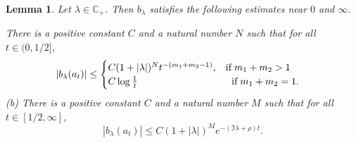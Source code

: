 \documentclass[11pt,reqno]{amsart}
\newtheorem{lemma}[theorem]{Lemma}
\theoremstyle{definition}
\theoremstyle{definition}
\numberwithin{equation}{section}
\begin{document}
\begin{lemma}\label{lemma- estimates of b lambda}
Let $\lambda\in \mathbb{C}_+$. Then $b_\lambda$ satisfies the following estimates near $0$ and $\infty$.

 There is a positive constant $C$ and a natural number $N$ such that for all $t\in(0,1/2]$,
\begin{eqnarray*}
|b_\lambda(a_t)|\leq \begin{cases}C (1+|\lambda|)^Nt^{-(m_1+m_2-1)},\hspace{3mm}\textup{if}\hspace{1mm} m_1+m_2>1\\
C \log \frac{1}{t}\hspace{33.5mm}\textup{if}\hspace{1mm}m_1+m_2=1.
\end{cases}
\end{eqnarray*}
\noindent (b) There is a positive constant $C$ and a natural number $M$ such that for all $t\in [1/2,\infty]$,
$$
|b_\lambda(a_t)|\leq C (1+|\lambda|)^Me^{-(\Im\lambda+\rho)t}.
$$
\end{lemma}
\end{document}
